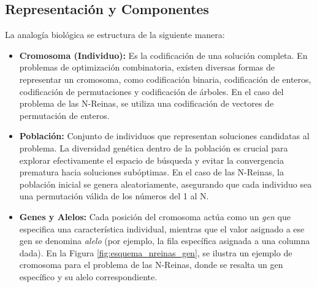 \documentclass[11pt,a4paper,twocolumn]{article}
\begin{document}
\subsection{Representación y Componentes}
La analogía biológica se estructura de la siguiente manera:
\begin{itemize}
    \item \textbf{Cromosoma (Individuo):} Es la codificación de una solución completa. En problemas de optimización combinatoria, existen diversas formas de representar un cromosoma, como codificación binaria, codificación de enteros, codificación de permutaciones y codificación de árboles. En el caso del problema de las N-Reinas, se utiliza una codificación de vectores de permutación de enteros.
    \item \textbf{Población:} Conjunto de individuos que representan soluciones candidatas al problema. La diversidad genética dentro de la población es crucial para explorar efectivamente el espacio de búsqueda y evitar la convergencia prematura hacia soluciones subóptimas. En el caso de las N-Reinas, la población inicial se genera aleatoriamente, asegurando que cada individuo sea una permutación válida de los números del 1 al N. 
    \item \textbf{Genes y Alelos:} Cada posición del cromosoma actúa como un \textit{gen} que especifica una característica individual, mientras que el valor asignado a ese gen se denomina \textit{alelo} (por ejemplo, la fila específica asignada a una columna dada). En la Figura \ref{fig:esquema_nreinas_gen}, se ilustra un ejemplo de cromosoma para el problema de las N-Reinas, donde se resalta un gen específico y su alelo correspondiente.
    \cite{ionos}
    
    \begin{figure}[H]
    \centering
\end{figure}
\end{itemize}
\end{document}
